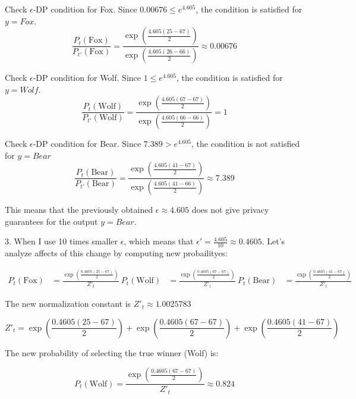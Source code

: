 Check $\epsilon$-DP condition for Fox. Since $0.00676 \leq e^{4.605}$, the condition is satisfied for $y = Fox$.
\begin{equation}
  \frac{P_t(\text{Fox})}{P_{t'}(\text{Fox})} = \frac{\exp\left(\frac{4.605(25 - 67)}{2}\right)}{\exp\left(\frac{4.605(26 - 66)}{2}\right)} \approx 0.00676
\end{equation}

Check $\epsilon$-DP condition for Wolf. Since $1 \leq e^{4.605}$, the condition is satisfied for $y = Wolf$.
\begin{equation}
  \frac{P_t(\text{Wolf})}{P_{t'}(\text{Wolf})} = \frac{\exp\left(\frac{4.605(67 - 67)}{2}\right)}{\exp\left(\frac{4.605(66 - 66)}{2}\right)} = 1
\end{equation}

Check $\epsilon$-DP condition for Bear. Since $7.389 > e^{4.605}$, the condition is not satisfied for $y = Bear$
\begin{equation}
  \frac{P_t(\text{Bear})}{P_{t'}(\text{Bear})} = \frac{\exp\left(\frac{4.605(41 - 67)}{2}\right)}{\exp\left(\frac{4.605(41 - 66)}{2}\right)} \approx 7.389
\end{equation}

This means that the previously obtained $\epsilon \approx 4.605$ does not give privacy guarantees for the output $y = Bear$.

3. When I use 10 times smaller $\epsilon$, which means that $\epsilon' = \frac{4.605}{10} \approx 0.4605$.
Let's analyze affects of this change by computing new probailityes:

\begin{align*}
  P_t(\text{Fox}) &= \frac{\exp\left(\frac{0.4605(25 - 67)}{2}\right)}{Z'_t} \
  P_t(\text{Wolf}) &= \frac{\exp\left(\frac{0.4605(67 - 67)}{2}\right)}{Z'_t} \
  P_t(\text{Bear}) &= \frac{\exp\left(\frac{0.4605(41 - 67)}{2}\right)}{Z'_t}
\end{align*}

The new normalization constant is $Z'_t \approx 1.0025783$~\cite[]{norm_Z_prim}

\begin{equation}
  Z'_t = \exp\left(\frac{0.4605(25 - 67)}{2}\right) + \exp\left(\frac{0.4605(67 - 67)}{2}\right) + \exp\left(\frac{0.4605(41 - 67)}{2}\right)
\end{equation}

The new probability of selecting the true winner (Wolf) is:

\begin{equation}
  P_t(\text{Wolf}) = \frac{\exp\left(\frac{0.4605(67 - 67)}{2}\right)}{Z'_t} \approx 0.824
\end{equation}


